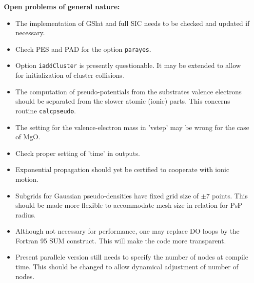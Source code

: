 \documentclass[12pt]{article}
\begin{document}
{\Large\bf Open problems of general nature:}
\begin{itemize}
  \item The implementation of GSlat and full SIC needs to be checked
        and updated if necessary.
  \item Check PES and PAD for the option  {\tt parayes}.
  \item Option {\tt iaddCluster} is presently questionable. 
        It may be extended to allow
        for initialization of cluster collisions.
  \item The computation of pseudo-potentials from the substrates
        valence electrons should be separated from the slower
        atomic (ionic) parts. This concerns routine {\tt calcpseudo}.
  \item The setting for the valence-electron mass in 'vstep'
        may be wrong for the case of MgO.
  \item Check proper setting of 'time' in outputs.
  \item Exponential propagation should yet be certified to cooperate
        with ionic motion.
  \item Subgrids for Gaussian pseudo-densities have fixed grid size
        of $\pm 7$ points. This should be made more flexible to
        accommodate mesh size in relation for PsP radius.
  \item Although not necessary for performance, one may replace
        DO loops by the Fortran 95 SUM construct. This will make the
        code more transparent.
  \item Present parallele version  still needs to specify the number
        of nodes at compile time. This should be 
        changed to allow dynamical adjustment of number of nodes.
\end{itemize}
\end{document}
